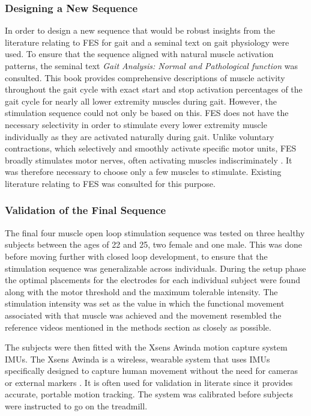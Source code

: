 \subsubsection{Designing a New Sequence}
In order to design a new sequence that would be robust insights from the literature relating to FES for gait and a seminal text on gait physiology were used. To ensure that the sequence aligned with natural muscle activation patterns, the seminal text \textit{Gait Analysis: Normal and Pathological function} \cite{perry_gait_2024} was consulted. This book provides comprehensive descriptions of muscle activity throughout the gait cycle with exact start and stop activation percentages of the gait cycle for nearly all lower extremity muscles during gait. However, the stimulation sequence could not only be based on this. FES does not have the necessary selectivity in order to stimulate every lower extremity muscle individually as they are activated naturally during gait. Unlike voluntary contractions, which selectively and smoothly activate specific motor units, FES broadly stimulates motor nerves, often activating muscles indiscriminately . It was therefore necessary to choose only a few muscles to stimulate. Existing literature relating to FES was consulted for this purpose.



\subsubsection{Validation of the Final Sequence}
The final four muscle open loop stimulation sequence was tested on three healthy subjects between the ages of 22 and 25, two female and one male. This was done before moving further with closed loop development, to ensure that the stimulation sequence was generalizable across individuals. During the setup phase the optimal placements for the electrodes for each individual subject were found along with the motor threshold and the maximum tolerable intensity. The stimulation intensity was set as the value in which the functional movement associated with that muscle was achieved and the movement resembled the reference videos mentioned in the methods section as closely as possible.

The subjects were then fitted with the Xsens Awinda  motion capture system IMUs. The Xsens Awinda is a wireless, wearable system that uses IMUs specifically designed to capture human movement without the need for cameras or external markers \cite{noauthor_mvn_nodate}. It is often used for validation in literate since it provides accurate, portable motion tracking. The system was calibrated before subjects were instructed to go on the treadmill. 

